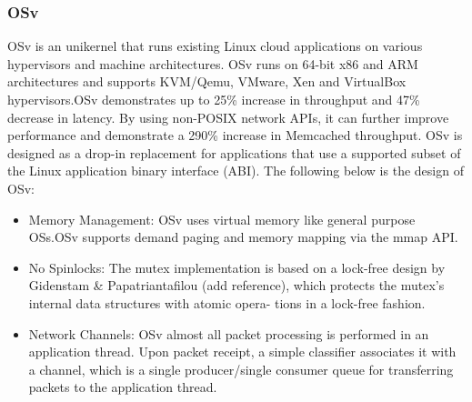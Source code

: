 \subsubsection{OSv}
OSv is an unikernel that runs existing Linux cloud applications on various hypervisors 
and machine architectures. OSv runs on 64-bit x86 and
ARM architectures and supports KVM/Qemu, VMware, Xen and VirtualBox 
hypervisors.OSv demonstrates up to 25\% increase in throughput and 47\% 
decrease in latency. 
By using non-POSIX network APIs,
it can further improve performance and demonstrate a
290\% increase in Memcached throughput.
OSv is designed as a drop-in replacement for applications that use a
supported subset of the Linux application binary interface (ABI).
The following below is the design of OSv: 
\begin{itemize}
  \item Memory Management: OSv uses virtual memory like
  general purpose OSs.OSv supports demand paging and memory mapping
  via the mmap API.
  \item No Spinlocks: The mutex implementation is based on a lock-free design 
  by Gidenstam \& Papatriantafilou (add reference), which protects
  the mutex’s internal data structures with atomic opera-
  tions in a lock-free fashion.
  \item Network Channels: OSv almost all packet processing is performed in an application thread. 
  Upon packet receipt, a simple classifier associates it with a channel, which is a single producer/single
  consumer queue for transferring packets to the application thread.
\end{itemize}


